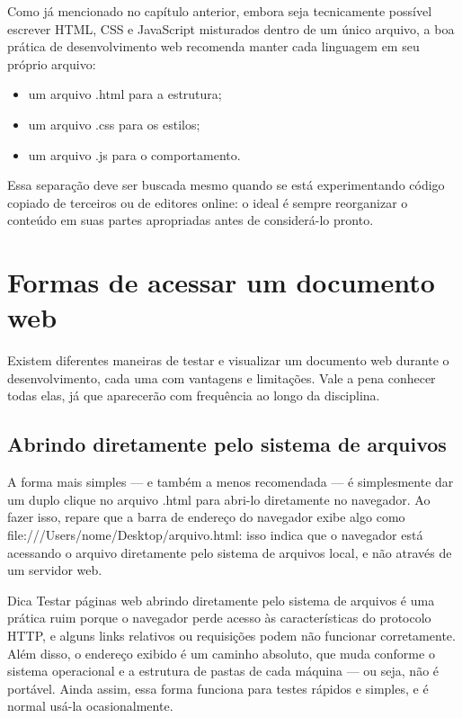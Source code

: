Como já mencionado no capítulo anterior, embora seja tecnicamente possível escrever HTML, CSS e JavaScript misturados dentro de um único arquivo, a boa prática de desenvolvimento web recomenda manter cada linguagem em seu próprio arquivo:

\begin{itemize}
  \item um arquivo .html para a estrutura;
\end{itemize}

\begin{itemize}
  \item um arquivo .css para os estilos;
\end{itemize}

\begin{itemize}
  \item um arquivo .js para o comportamento.
\end{itemize}

Essa separação deve ser buscada mesmo quando se está experimentando código copiado de terceiros ou de editores online: o ideal é sempre reorganizar o conteúdo em suas partes apropriadas antes de considerá-lo pronto.

\section{Formas de acessar um documento web}

Existem diferentes maneiras de testar e visualizar um documento web durante o desenvolvimento, cada uma com vantagens e limitações. Vale a pena conhecer todas elas, já que aparecerão com frequência ao longo da disciplina.

\subsection{Abrindo diretamente pelo sistema de arquivos}

A forma mais simples — e também a menos recomendada — é simplesmente dar um duplo clique no arquivo .html para abri-lo diretamente no navegador. Ao fazer isso, repare que a barra de endereço do navegador exibe algo como file:///Users/nome/Desktop/arquivo.html: isso indica que o navegador está acessando o arquivo diretamente pelo sistema de arquivos local, e não através de um servidor web.

\begin{infobox}{Dica}
Testar páginas web abrindo diretamente pelo sistema de arquivos é uma prática ruim porque o navegador perde acesso às características do protocolo HTTP, e alguns links relativos ou requisições podem não funcionar corretamente. Além disso, o endereço exibido é um caminho absoluto, que muda conforme o sistema operacional e a estrutura de pastas de cada máquina — ou seja, não é portável. Ainda assim, essa forma funciona para testes rápidos e simples, e é normal usá-la ocasionalmente.
\end{infobox}

